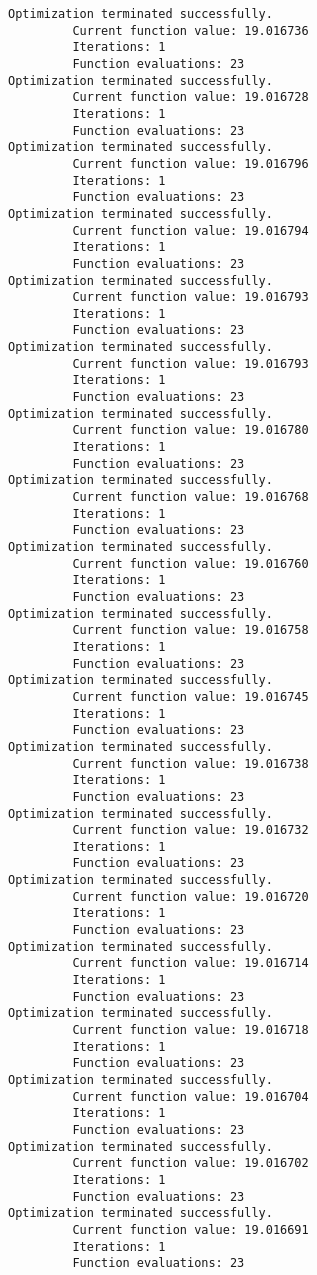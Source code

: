 \documentclass[11pt]{article}
\begin{document}
\begin{Verbatim}[commandchars=\\\{\}]
Optimization terminated successfully.
         Current function value: 19.016736
         Iterations: 1
         Function evaluations: 23
Optimization terminated successfully.
         Current function value: 19.016728
         Iterations: 1
         Function evaluations: 23
Optimization terminated successfully.
         Current function value: 19.016796
         Iterations: 1
         Function evaluations: 23
Optimization terminated successfully.
         Current function value: 19.016794
         Iterations: 1
         Function evaluations: 23
Optimization terminated successfully.
         Current function value: 19.016793
         Iterations: 1
         Function evaluations: 23
Optimization terminated successfully.
         Current function value: 19.016793
         Iterations: 1
         Function evaluations: 23
Optimization terminated successfully.
         Current function value: 19.016780
         Iterations: 1
         Function evaluations: 23
Optimization terminated successfully.
         Current function value: 19.016768
         Iterations: 1
         Function evaluations: 23
Optimization terminated successfully.
         Current function value: 19.016760
         Iterations: 1
         Function evaluations: 23
Optimization terminated successfully.
         Current function value: 19.016758
         Iterations: 1
         Function evaluations: 23
Optimization terminated successfully.
         Current function value: 19.016745
         Iterations: 1
         Function evaluations: 23
Optimization terminated successfully.
         Current function value: 19.016738
         Iterations: 1
         Function evaluations: 23
Optimization terminated successfully.
         Current function value: 19.016732
         Iterations: 1
         Function evaluations: 23
Optimization terminated successfully.
         Current function value: 19.016720
         Iterations: 1
         Function evaluations: 23
Optimization terminated successfully.
         Current function value: 19.016714
         Iterations: 1
         Function evaluations: 23
Optimization terminated successfully.
         Current function value: 19.016718
         Iterations: 1
         Function evaluations: 23
Optimization terminated successfully.
         Current function value: 19.016704
         Iterations: 1
         Function evaluations: 23
Optimization terminated successfully.
         Current function value: 19.016702
         Iterations: 1
         Function evaluations: 23
Optimization terminated successfully.
         Current function value: 19.016691
         Iterations: 1
         Function evaluations: 23

\end{Verbatim}
\end{document}
